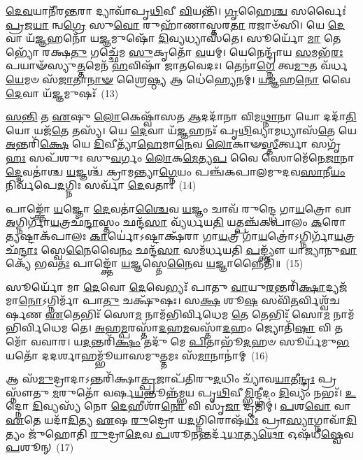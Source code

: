 \-\ul{𑌦𑍇}\-\-\ul{𑌵}\-𑌯𑌾𑌨𑍀᳴𑌰\-\ul{𑌨𑍍𑌤}\-𑌰𑌾 𑌦𑍍𑌯𑌾𑌵𑌾᳴𑌪𑍃\-\ul{𑌥𑌿}\-𑌵𑍀 \ul{𑌵𑌿}\-𑌯𑌨𑍍𑌤𑌿᳴। \ul{𑌗𑍃}\-𑌹𑍈\-\ul{𑌶𑍍𑌚} 𑌸𑌰𑍍𑌵𑍈𑌃॑ \ul{𑌪𑍍𑌰}\-𑌜\-\ul{𑌯𑌾} 𑌨𑍍𑌵\-\ul{𑌗𑍍𑌰𑍇} 𑌸𑍁\-\ul{𑌵𑍋} 𑌰𑍁𑌹𑌾᳴𑌣𑌾𑌸𑍍𑌤𑌰\-\ul{𑌤𑌾} 𑌰𑌜𑌾𑍞᳴𑌸𑌿। 𑌯𑍇 \ul{𑌦𑍇}\-𑌵𑌾 𑌯᳴\-\ul{𑌜𑍍𑌞}\-𑌹𑌨𑍋᳴ 𑌯\-\ul{𑌜𑍍𑌞}\-𑌮𑍁𑌷𑍋᳴ \ul{𑌦𑌿}\-𑌵𑍍𑌯𑌧𑍍𑌯𑌾𑌸᳴𑌤𑍇। 𑌸𑍂𑌰𑍍𑌯𑍋᳴ \ul{𑌮𑌾} 𑌤𑍇𑌭𑍍𑌯𑍋᳴ 𑌰𑌕𑍍𑌷\-\ul{𑌤𑍁} 𑌗𑌚𑍍𑌛𑍇᳴𑌮 \ul{𑌸𑍁}\-𑌕𑍃𑌤𑍋᳴ \ul{𑌵}\-𑌯𑌮𑍍। 𑌯𑍇𑌨𑍇𑌨𑍍𑌦𑍍𑌰𑌾᳴𑌯 \ul{𑌸}\-𑌮𑌭᳴\-\ul{𑌰𑌃} 𑌪𑌯𑌾𑍟᳴𑌸𑍍𑌯𑍁\-\ul{𑌤𑍍𑌤}\-\-𑌮𑍇𑌨᳴ \ul{𑌹}\-𑌵𑌿𑌷𑌾᳴ 𑌜𑌾𑌤𑌵𑍇𑌦𑌃। 𑌤𑍇𑌨𑌾॑\-\ul{𑌗𑍍𑌨𑍇} 𑌤𑍍𑌵\-\ul{𑌮𑍁}\-𑌤 𑌵᳴𑌰𑍍𑌧\-\ul{𑌯𑍇}\-𑌮𑍞 𑌸᳴\-\ul{𑌜𑌾}\-𑌤𑌾\-\ul{𑌨𑌾}\-\-\ul{𑍟} 𑌶𑍍𑌰𑍈\-\ul{𑌷𑍍𑌠𑍍𑌯} 𑌆 𑌧𑍇॑𑌹𑍍𑌯𑍇𑌨𑌮𑍍। \ul{𑌯}\-\-\ul{𑌜𑍍𑌞}\-𑌹\-\ul{𑌨𑍋} 𑌵𑍈 \ul{𑌦𑍇}\-𑌵𑌾 𑌯᳴\-\ul{𑌜𑍍𑌞}\-𑌮𑍁𑌷𑌃᳴~(13)

\-\ul{𑌸}\-\-\ul{𑌨𑍍𑌤𑌿} 𑌤 \ul{𑌏}\-𑌷𑍁 \ul{𑌲𑍋}\-𑌕𑍇𑌷𑍍𑌵𑌾᳴𑌸𑌤 \ul{𑌆}\-𑌦𑌦𑌾᳴𑌨𑌾 𑌵𑌿𑌮\-\ul{𑌥𑍍𑌨𑌾}\-𑌨𑌾 𑌯𑍋 𑌦𑌦𑌾᳴\-\ul{𑌤𑌿} 𑌯𑍋 𑌯𑌜᳴\-\ul{𑌤𑍇} 𑌤𑌸𑍍𑌯᳴। 𑌯𑍇 \ul{𑌦𑍇}\-𑌵𑌾 𑌯᳴\-\ul{𑌜𑍍𑌞}\-𑌹𑌨𑌃᳴ 𑌪𑍃\-\ul{𑌥𑌿}\-𑌵𑍍𑌯𑌾𑌮𑌧𑍍𑌯𑌾𑌸᳴\-\ul{𑌤𑍇} 𑌯𑍇 \ul{𑌅}\-𑌨𑍍𑌤𑌰𑌿᳴\-\ul{𑌕𑍍𑌷𑍇} 𑌯𑍇 \ul{𑌦𑌿}\-𑌵𑍀𑌤𑍍𑌯𑌾᳴\-\ul{𑌹𑍇}\-𑌮𑌾\-\ul{𑌨𑍇}\-𑌵 \ul{𑌲𑍋}\-𑌕𑌾𑍟\-\ul{𑌸𑍍𑌤𑍀}\-𑌰𑍍𑌤𑍍𑌵𑌾 𑌸𑌗𑍃᳴\-\ul{𑌹𑌃} 𑌸𑌪᳴𑌶𑍁𑌃 𑌸𑍁\-\ul{𑌵}\-𑌰𑍍𑌗𑌂 \ul{𑌲𑍋}\-𑌕\-\ul{𑌮𑍇}\-𑌤𑍍𑌯\-\ul{𑌪} 𑌵𑍈 𑌸𑍋𑌮𑍇᳴𑌨𑍇\-\ul{𑌜𑌾}\-𑌨𑌾\-\ul{𑌦𑍍𑌦𑍇}\-𑌵𑌤𑌾॑𑌶𑍍𑌚 \ul{𑌯}\-𑌜𑍍𑌞𑌶𑍍𑌚᳴ 𑌕𑍍𑌰𑌾𑌮𑌨𑍍𑌤𑍍𑌯𑌾\-\ul{𑌗𑍍𑌨𑍇}\-𑌯𑌂 𑌪𑌞𑍍𑌚᳴𑌕𑌪𑌾𑌲𑌮𑍁𑌦𑌵\-\ul{𑌸𑌾}\-𑌨𑍀\-\ul{𑌯𑌂} 𑌨𑌿𑌰𑍍𑌵᳴𑌪𑍇\-\ul{𑌦}\-𑌗𑍍𑌨𑌿𑌃 𑌸𑌰𑍍𑌵𑌾᳴ \ul{𑌦𑍇}\-𑌵𑌤𑌾𑌃॑~(14)

𑌪𑌾𑌙𑍍𑌕𑍍𑌤𑍋᳴ \ul{𑌯}\-𑌜𑍍𑌞𑍋 \ul{𑌦𑍇}\-𑌵𑌤𑌾॑\-\ul{𑌶𑍍𑌚𑍈}\-𑌵 \ul{𑌯}\-𑌜𑍍𑌞𑌂 𑌚𑌾𑌵᳴ 𑌰𑍁𑌨𑍍𑌦𑍍𑌧𑍇 𑌗𑌾\-\ul{𑌯}\-𑌤𑍍𑌰𑍋 𑌵𑌾 \ul{𑌅}\-𑌗𑍍𑌨𑌿𑌰𑍍𑌗𑌾᳴\-\ul{𑌯}\-𑌤𑍍𑌰𑌛᳴\-\ul{𑌨𑍍𑌦𑌾}\-𑌸𑍍𑌤𑌂 𑌛𑌨𑍍𑌦᳴\-\ul{𑌸𑌾} 𑌵𑍍𑌯᳴𑌰𑍍𑌧𑌯\-\ul{𑌤𑌿} 𑌯𑌤𑍍𑌪𑌞𑍍𑌚᳴𑌕𑌪𑌾𑌲𑌂 \ul{𑌕}\-𑌰𑍋\-\ul{𑌤𑍍𑌯}\-𑌷𑍍𑌟𑌾𑌕᳴𑌪𑌾𑌲𑌃 \ul{𑌕𑌾}\-𑌰𑍍𑌯𑍋॑\-𑌽𑌷𑍍𑌟𑌾𑌕𑍍𑌷᳴𑌰𑌾 𑌗𑌾\-\ul{𑌯}\-𑌤𑍍𑌰𑍀 𑌗𑌾᳴\-\ul{𑌯}\-𑌤𑍍𑌰𑍋॑\-𑌽𑌗𑍍𑌨𑌿𑌰𑍍𑌗𑌾᳴\-\ul{𑌯}\-𑌤𑍍𑌰𑌛᳴\-\ul{𑌨𑍍𑌦𑌾𑌃} 𑌸𑍍𑌵𑍇\-\ul{𑌨𑍈}\-𑌵𑍈\-\ul{𑌨𑌂} 𑌛𑌨𑍍𑌦᳴\-\ul{𑌸𑌾} 𑌸𑌮᳴𑌰𑍍𑌧𑌯𑌤𑌿 \ul{𑌪}\-𑌙𑍍𑌕𑍍𑌤𑍍𑌯𑍗᳴ 𑌯𑌾𑌜𑍍𑌯𑌾𑌨𑍁\-\ul{𑌵𑌾}\-𑌕𑍍𑌯𑍇᳴ 𑌭𑌵\-\ul{𑌤𑌃} 𑌪𑌾𑌙𑍍𑌕𑍍𑌤𑍋᳴ \ul{𑌯}\-𑌜𑍍𑌞𑌸𑍍𑌤𑍇\-\ul{𑌨𑍈}\-𑌵 \ul{𑌯}\-𑌜𑍍𑌞𑌾𑌨𑍍𑌨𑍈𑌤𑌿᳴॥~(15)

{\anuvakamend[{\-\ul{𑌸}\-\-\ul{𑌵𑌿}\-\-\ul{𑌤}\-\-\ul{𑌰𑍍𑌦𑍇}\-𑌵𑌾 𑌯᳴\-\ul{𑌜𑍍𑌞}\-𑌮𑍁\-\ul{𑌷𑌃} 𑌸𑌰𑍍𑌵𑌾᳴ \ul{𑌦𑍇}\-𑌵\-\ul{𑌤𑌾}\-𑌸𑍍𑌤𑍍𑌰𑌿𑌚᳴𑌤𑍍𑌵𑌾𑌰𑌿𑍞𑌶𑌚𑍍𑌚}]}%

𑌸𑍂𑌰𑍍𑌯𑍋᳴ 𑌮𑌾 \ul{𑌦𑍇}\-𑌵𑍋 \ul{𑌦𑍇}\-𑌵𑍇𑌭𑍍𑌯𑌃᳴ 𑌪𑌾𑌤𑍁 \ul{𑌵𑌾}\-𑌯𑍁\-\ul{𑌰}\-𑌨𑍍𑌤𑌰𑌿᳴\-\ul{𑌕𑍍𑌷𑌾}\-𑌦𑍍𑌯𑌜᳴𑌮𑌾\-\ul{𑌨𑍋}\-\-𑌽𑌗𑍍𑌨𑌿𑌰𑍍𑌮𑌾᳴ 𑌪𑌾\-\ul{𑌤𑍁} 𑌚𑌕𑍍𑌷𑍁᳴𑌷𑌃। 𑌸\-\ul{𑌕𑍍𑌷} 𑌶𑍂\-\ul{𑌷} 𑌸𑌵𑌿᳴\-\ul{𑌤}\-𑌰𑍍𑌵𑌿𑌶𑍍𑌵᳴𑌚𑌰𑍍\mbox{}𑌷𑌣 \ul{𑌏}\-𑌤𑍇𑌭𑌿𑌃᳴ 𑌸𑍋\-\ul{𑌮} 𑌨𑌾𑌮᳴𑌭𑌿𑌰𑍍𑌵𑌿𑌧𑍇𑌮 \ul{𑌤𑍇} 𑌤𑍇𑌭𑌿𑌃᳴ 𑌸𑍋\-\ul{𑌮} 𑌨𑌾𑌮᳴𑌭𑌿𑌰𑍍𑌵𑌿𑌧𑍇𑌮 𑌤𑍇। \ul{𑌅}\-𑌹\-\ul{𑌮𑍍𑌪}\-𑌰𑌸𑍍𑌤𑌾᳴\-\ul{𑌦}\-𑌹\-\ul{𑌮}\-𑌵𑌸𑍍𑌤𑌾᳴\-\ul{𑌦}\-𑌹𑌂 𑌜𑍍𑌯𑍋𑌤𑌿᳴\-\ul{𑌷𑌾} 𑌵𑌿 𑌤𑌮𑍋᳴ 𑌵𑌵𑌾𑌰। 𑌯\-\ul{𑌦}\-𑌨𑍍𑌤𑌰𑌿᳴\-\ul{𑌕𑍍𑌷𑌂} 𑌤𑌦𑍁᳴ 𑌮𑍇 \ul{𑌪𑌿}\-𑌤𑌾𑌭𑍂᳴\-\ul{𑌦}\-𑌹𑍞 𑌸𑍂𑌰𑍍𑌯᳴𑌮𑍁\-\ul{𑌭}\-𑌯𑌤𑍋᳴ 𑌦𑌦𑌰𑍍\mbox{}\-\ul{𑌶𑌾}\-𑌹𑌮𑍍𑌭𑍂᳴𑌯𑌾𑌸𑌮𑍁\-\ul{𑌤𑍍𑌤}\-𑌮𑌃 𑌸᳴\-\ul{𑌮𑌾}\-𑌨𑌾𑌨𑌾॑𑌮𑍍~(16)

𑌆 𑌸᳴\-\ul{𑌮𑍁}\-𑌦𑍍𑌰𑌾𑌦𑌾\-𑌽𑌨𑍍𑌤𑌰𑌿᳴𑌕𑍍𑌷𑌾\-\ul{𑌤𑍍𑌪𑍍𑌰}\-𑌜𑌾𑌪᳴𑌤𑌿𑌰𑍁\-\ul{𑌦}\-𑌧𑌿𑌂 𑌚𑍍𑌯𑌾᳴𑌵\-\ul{𑌯𑌾}\-𑌤𑍀\-\ul{𑌨𑍍𑌦𑍍𑌰𑌃} 𑌪𑍍𑌰 𑌸𑍍𑌨𑍗᳴𑌤𑍁 \ul{𑌮}\-𑌰𑍁𑌤𑍋᳴ 𑌵𑌰𑍍\mbox{}𑌷\-\ul{𑌯}\-𑌨𑍍𑌤𑍂𑌨𑍍𑌨᳴𑌮𑍍𑌭𑌯 𑌪𑍃\-\ul{𑌥𑌿}\-𑌵𑍀\-\ul{𑌮𑍍𑌭𑌿}\-𑌨𑍍𑌦𑍍𑌧𑍀𑌦𑌂 \ul{𑌦𑌿}\-𑌵𑍍𑌯𑌂 𑌨𑌭𑌃᳴। \ul{𑌉}\-𑌦𑍍𑌨𑍋 \ul{𑌦𑌿}\-𑌵𑍍𑌯𑌸𑍍𑌯᳴ 𑌨𑍋 \ul{𑌦𑍇}\-𑌹𑍀𑌶𑌾᳴\-\ul{𑌨𑍋} 𑌵𑌿 𑌸𑍃᳴\-\ul{𑌜𑌾} 𑌦𑍃𑌤𑌿𑌮𑍍॑। \ul{𑌪}\-𑌶\-\ul{𑌵𑍋} 𑌵𑌾 \ul{𑌏}\-𑌤𑍇 𑌯𑌦𑌾᳴\-\ul{𑌦𑌿}\-𑌤𑍍𑌯 \ul{𑌏}\-𑌷 \ul{𑌰𑍁}\-𑌦𑍍𑌰𑍋 𑌯\-\ul{𑌦}\-𑌗𑍍𑌨𑌿𑌰𑍋𑌷᳴\-\ul{𑌧𑍀𑌃} 𑌪𑍍𑌰𑌾\-\ul{𑌸𑍍𑌯𑌾}\-𑌗𑍍𑌨𑌾𑌵𑌾᳴\-\ul{𑌦𑌿}\-𑌤𑍍𑌯𑌂 𑌜𑍁᳴𑌹𑍋𑌤𑌿 \ul{𑌰𑍁}\-𑌦𑍍𑌰𑌾\-\ul{𑌦𑍇}\-𑌵 \ul{𑌪}\-𑌶𑍂\-\ul{𑌨}\-𑌨𑍍𑌤𑌰𑍍𑌦᳴\-\ul{𑌧𑌾}\-𑌤𑍍𑌯\-\ul{𑌥𑍋} 𑌓𑌷᳴𑌧𑍀\-\ul{𑌷𑍍𑌵𑍇}\-𑌵 \ul{𑌪}\-𑌶𑍂𑌨𑍍~(17)

